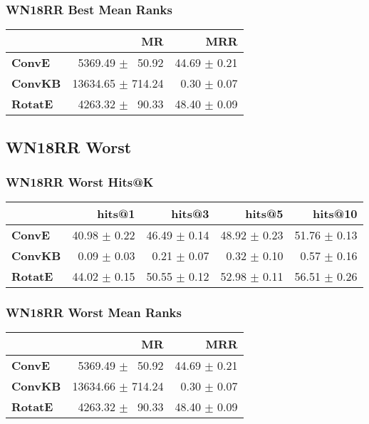 \documentclass{article}
\begin{document}
\subsubsection{WN18RR Best Mean Ranks}
    \begin{center}
    \begin{tabular}{lrr}
\toprule
{} &                 MR &           MRR \\
\midrule
\textbf{ConvE } &  $\phantom{5}$5369.49 $\pm$ $\phantom{5}$50.92 &  44.69 $\pm$ 0.21 \\
\textbf{ConvKB} &  13634.65 $\pm$ 714.24 &  $\phantom{5}$0.30 $\pm$ 0.07 \\
\textbf{RotatE} &  $\phantom{5}$4263.32 $\pm$ $\phantom{5}$90.33 &  48.40 $\pm$ 0.09 \\
\bottomrule
\end{tabular}

    \end{center}
\subsection{WN18RR Worst}
\subsubsection{WN18RR Worst Hits@K}
    \begin{center}
    \begin{tabular}{lrrrr}
\toprule
{} &        hits@1 &        hits@3 &        hits@5 &       hits@10 \\
\midrule
\textbf{ConvE } &  40.98 $\pm$ 0.22 &  46.49 $\pm$ 0.14 &  48.92 $\pm$ 0.23 &  51.76 $\pm$ 0.13 \\
\textbf{ConvKB} &  $\phantom{5}$0.09 $\pm$ 0.03 &  $\phantom{5}$0.21 $\pm$ 0.07 &  $\phantom{5}$0.32 $\pm$ 0.10 &  $\phantom{5}$0.57 $\pm$ 0.16 \\
\textbf{RotatE} &  44.02 $\pm$ 0.15 &  50.55 $\pm$ 0.12 &  52.98 $\pm$ 0.11 &  56.51 $\pm$ 0.26 \\
\bottomrule
\end{tabular}

    \end{center}
\subsubsection{WN18RR Worst Mean Ranks}
    \begin{center}
    \begin{tabular}{lrr}
\toprule
{} &                 MR &           MRR \\
\midrule
\textbf{ConvE } &  $\phantom{5}$5369.49 $\pm$ $\phantom{5}$50.92 &  44.69 $\pm$ 0.21 \\
\textbf{ConvKB} &  13634.66 $\pm$ 714.24 &  $\phantom{5}$0.30 $\pm$ 0.07 \\
\textbf{RotatE} &  $\phantom{5}$4263.32 $\pm$ $\phantom{5}$90.33 &  48.40 $\pm$ 0.09 \\
\bottomrule
\end{tabular}

    \end{center}
\end{document}
